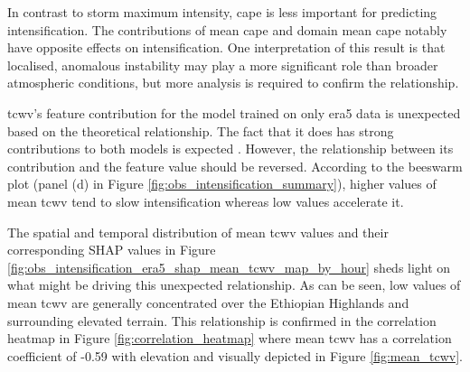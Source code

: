 In contrast to storm maximum intensity, \acrshort{cape} is less important for predicting intensification. The contributions of mean \acrshort{cape} and domain mean \acrshort{cape} notably have opposite effects on intensification. One interpretation of this result is that localised, anomalous instability may play a more significant role than broader atmospheric conditions, but more analysis is required to confirm the relationship.

\acrfull{tcwv}'s feature contribution for the model trained on only \acrshort{era5} data is unexpected based on the theoretical relationship. The fact that it does has strong contributions to both models is expected \citep{Li2023,Muetzelfeldt2025,Klein2020}. However, the relationship between its contribution and the feature value should be reversed. According to the beeswarm plot (panel (d) in Figure \ref{fig:obs_intensification_summary}), higher values of mean \acrshort{tcwv} tend to slow intensification whereas low values accelerate it.

The spatial and temporal distribution of mean \acrshort{tcwv} values and their corresponding SHAP values in Figure \ref{fig:obs_intensification_era5_shap_mean_tcwv_map_by_hour} sheds light on what might be driving this unexpected relationship. As can be seen, low values of mean \acrshort{tcwv} are generally concentrated over the Ethiopian Highlands and surrounding elevated terrain. This relationship is confirmed in the correlation heatmap in Figure \ref{fig:correlation_heatmap} where mean \acrshort{tcwv} has a correlation coefficient of -0.59 with elevation and visually depicted in Figure \ref{fig:mean_tcwv}.

